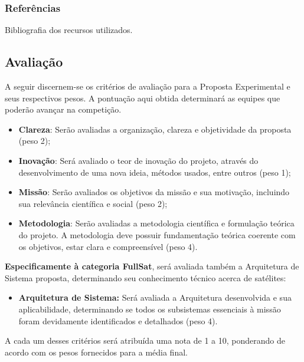         \subsubsection{Referências}
            Bibliografia dos recursos utilizados.

    \subsection{Avaliação}
        A seguir discernem-se os critérios de avaliação para a Proposta Experimental e seus respectivos pesos. A pontuação aqui obtida determinará as equipes que poderão avançar na competição.
        
        \begin{itemize}
            \item \textbf{Clareza}: Serão avaliadas a organização, clareza e objetividade da proposta (peso 2);
            
            \item \textbf{Inovação}: Será avaliado o teor de inovação do projeto, através do desenvolvimento de uma nova ideia, métodos usados, entre outros (peso 1);
                     
            \item \textbf{Missão}: Serão avaliados os objetivos da missão e sua motivação, incluindo sua relevância científica e social (peso 2);
            
            \item \textbf{Metodologia}: Serão avaliadas a metodologia científica e formulação teórica do projeto. A metodologia deve possuir fundamentação teórica coerente com os objetivos, estar clara e compreensível (peso 4).
        \end{itemize}

        \textbf{Especificamente à categoria FullSat}, será avaliada também a Arquitetura de Sistema proposta, determinando seu conhecimento técnico acerca de satélites:        
        \begin{itemize}
            \item \textbf{Arquitetura de Sistema:} Será avaliada a Arquitetura desenvolvida e sua aplicabilidade, determinando se todos os subsistemas essenciais à missão foram devidamente identificados e detalhados (peso 4). 
        \end{itemize}
        
        A cada um desses critérios será atribuída uma nota de 1 a 10, ponderando de acordo com os pesos fornecidos para a média final.

